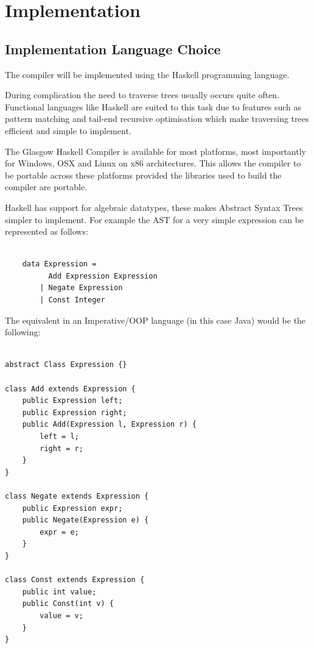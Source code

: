 \chapter{Implementation}


\section{Implementation Language Choice}

The compiler will be implemented using the Haskell programming language.

During complication the need to traverse trees usually occurs quite
often. Functional languages like Haskell are suited to this task 
due to features such as pattern matching and tail-end recursive optimisation 
which make traversing trees efficient and simple to implement.

The Glasgow Haskell Compiler is available for most platforms, most importantly for Windows, OSX and Linux 
on x86 architectures. This allows the compiler to be portable across these platforms provided the libraries 
used to build the compiler are portable.

Haskell has support for algebraic datatypes, these makes Abstract Syntax Trees
simpler to implement. For example the AST for a very simple expression
can be represented as follows:

\begin{lstlisting}[style=myHaskell]

    data Expression =
          Add Expression Expression
        | Negate Expression 
        | Const Integer

\end{lstlisting}

The equivalent in an Imperative/OOP language (in this case Java)
would be the following:

\begin{lstlisting}[style=myJava]

abstract Class Expression {}

class Add extends Expression {
    public Expression left;
    public Expression right;
    public Add(Expression l, Expression r) {
        left = l;
        right = r;    
    } 
}

class Negate extends Expression {
    public Expression expr;
    public Negate(Expression e) {
        expr = e;    
    }
} 

class Const extends Expression {
    public int value;
    public Const(int v) {
        value = v;
    }
}       

\end{lstlisting}


